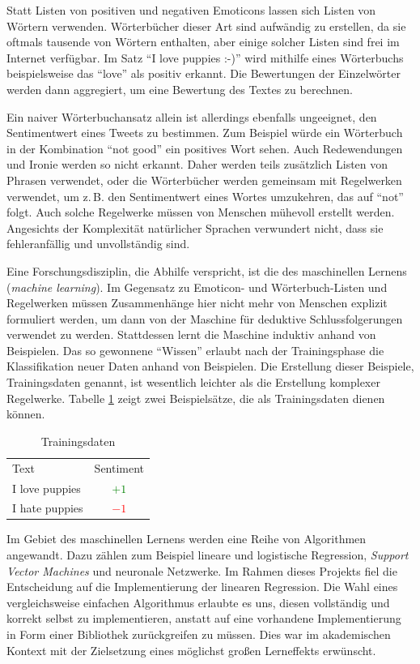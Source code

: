 Statt Listen von positiven und negativen Emoticons lassen sich Listen von Wörtern verwenden. Wörterbücher dieser Art sind aufwändig zu erstellen, da sie oftmals tausende von Wörtern enthalten, aber einige solcher Listen sind frei im Internet verfügbar. Im Satz "`I love puppies :-)"' wird mithilfe eines Wörterbuchs beispielsweise das "`love"' als positiv erkannt. Die Bewertungen der Einzelwörter werden dann aggregiert, um eine Bewertung des Textes zu berechnen.

Ein naiver Wörterbuchansatz allein ist allerdings ebenfalls ungeeignet, den Sentimentwert eines Tweets zu bestimmen. Zum Beispiel würde ein Wörterbuch in der Kombination "`not good"' ein positives Wort sehen. Auch Redewendungen und Ironie werden so nicht erkannt. Daher werden teils zusätzlich Listen von Phrasen verwendet, oder die Wörterbücher werden gemeinsam mit Regelwerken verwendet, um z.\,B. den Sentimentwert eines Wortes umzukehren, das auf "`not"' folgt. Auch solche Regelwerke müssen von Menschen mühevoll erstellt werden. Angesichts der Komplexität natürlicher Sprachen verwundert nicht, dass sie fehleranfällig und unvollständig sind.

Eine Forschungsdisziplin, die Abhilfe verspricht, ist die des maschinellen Lernens (\textit{machine learning}). Im Gegensatz zu Emoticon- und Wörterbuch-Listen und Regelwerken müssen Zusammenhänge hier nicht mehr von Menschen explizit formuliert werden, um dann von der Maschine für deduktive Schlussfolgerungen verwendet zu werden. Stattdessen lernt die Maschine induktiv anhand von Beispielen. Das so gewonnene "`Wissen"' erlaubt nach der Trainingsphase die Klassifikation neuer Daten anhand von Beispielen. Die Erstellung dieser Beispiele, Trainingsdaten genannt, ist wesentlich leichter als die Erstellung komplexer Regelwerke. Tabelle \ref{sentiment:trainingdata} zeigt zwei Beispielsätze, die als Trainingsdaten dienen können.

\begin{table}
 \centering
\caption{Trainingsdaten}\label{sentiment:trainingdata}
\begin{tabular}{lc}
Text & Sentiment \\
I love puppies & \textcolor{green}{\(+1\)} \\
I hate puppies & \textcolor{red}{\(-1\)} \\
\end{tabular}
\end{table}

Im Gebiet des maschinellen Lernens werden eine Reihe von Algorithmen angewandt. Dazu zählen zum Beispiel lineare und logistische Regression, \textit{Support Vector Machines} und neuronale Netzwerke. Im Rahmen dieses Projekts fiel die Entscheidung auf die Implementierung der linearen Regression. Die Wahl eines vergleichsweise einfachen Algorithmus erlaubte es uns, diesen vollständig und korrekt selbst zu implementieren, anstatt auf eine vorhandene Implementierung in Form einer Bibliothek zurückgreifen zu müssen. Dies war im akademischen Kontext mit der Zielsetzung eines möglichst großen Lerneffekts erwünscht.

